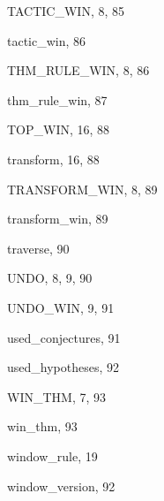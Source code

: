 \begin{theindex}
  \indexspace

  \item {\ptt TACTIC\_WIN}, 8, 85
  \item {\ptt tactic\_win}, 86
  \item {\ptt THM\_RULE\_WIN}, 8, 86
  \item {\ptt thm\_rule\_win}, 87
  \item {\ptt TOP\_WIN}, 16, 88
  \item {\ptt transform}, 16, 88
  \item {\ptt TRANSFORM\_WIN}, 8, 89
  \item {\ptt transform\_win}, 89
  \item {\ptt traverse}, 90

  \indexspace

  \item {\ptt UNDO}, 8, 9, 90
  \item {\ptt UNDO\_WIN}, 9, 91
  \item {\ptt used\_conjectures}, 91
  \item {\ptt used\_hypotheses}, 92

  \indexspace

  \item {\ptt WIN\_THM}, 7, 93
  \item {\ptt win\_thm}, 93
  \item {\ptt window\_rule}, 19
  \item {\ptt window\_version}, 92

\end{theindex}
